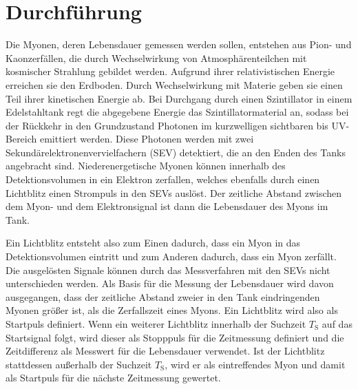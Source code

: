 \section{Durchf\"{u}hrung}

Die Myonen, deren Lebensdauer gemessen werden sollen, entstehen aus Pion- und Kaonzerfällen, die durch Wechselwirkung von Atmosphärenteilchen mit kosmischer Strahlung gebildet werden. Aufgrund ihrer relativistischen Energie erreichen sie den Erdboden. Durch Wechselwirkung mit Materie geben sie einen Teil ihrer kinetischen Energie ab. Bei Durchgang durch einen Szintillator in einem Edelstahltank regt die abgegebene Energie das Szintillatormaterial an, sodass bei der Rückkehr in den Grundzustand Photonen im kurzwelligen sichtbaren bis UV-Bereich emittiert werden. Diese Photonen werden mit zwei Sekundärelektronenvervielfachern (SEV) detektiert, die an den Enden des Tanks angebracht sind. Niederenergetische Myonen können innerhalb des Detektionsvolumen in ein Elektron zerfallen, welches ebenfalls durch einen Lichtblitz einen Strompuls in den SEVs auslöst. Der zeitliche Abstand zwischen dem Myon- und dem Elektronsignal ist dann die Lebensdauer des Myons im Tank.

Ein Lichtblitz entsteht also zum Einen dadurch, dass ein Myon in das Detektionsvolumen eintritt und zum Anderen dadurch, dass ein Myon zerfällt. Die ausgelösten Signale können durch das Messverfahren mit den SEVs nicht unterschieden werden. Als Basis für die Messung der Lebensdauer wird davon ausgegangen, dass der zeitliche Abstand zweier in den Tank eindringenden Myonen größer ist, als die Zerfallszeit eines Myons. Ein Lichtblitz wird also als Startpuls definiert. Wenn ein weiterer Lichtblitz innerhalb der Suchzeit $T_\text{S}$ auf das Startsignal folgt, wird dieser als Stopppuls für die Zeitmessung definiert und die Zeitdifferenz als Messwert für die Lebensdauer verwendet. Ist der Lichtblitz stattdessen außerhalb der Suchzeit $T_\text{S}$, wird er als eintreffendes Myon und damit als Startpuls für die nächste Zeitmessung gewertet.


